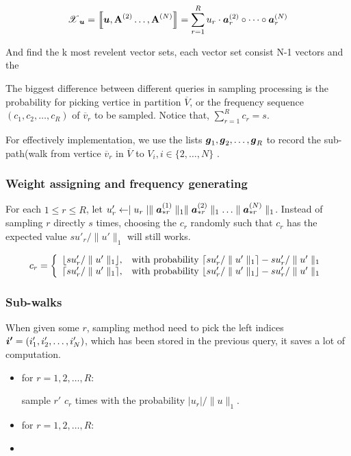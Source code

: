 \documentclass{article}
\newcommand{\T}[1]{\boldsymbol{\mathscr{\MakeUppercase{#1}}}}%
\newcommand{\V}[1]{{\bm{{\MakeLowercase{#1}}}}}%
\newcommand{\VnC}[3]{\V{#1}^{(#2)}_{#3}}%
\newcommand{\Vacol}[1]{\V{a}^{(#1)}_{*r}}
\newcommand{\M}[1]{{\bm{\mathbf{\MakeUppercase{#1}}}}}%
\newcommand{\Mn}[2]{\M{#1}^{(#2)}}%
\newcommand{\norm}[2]{\parallel#1\parallel_{#2}}
\newcommand{\KT}[1]{\left\llbracket #1 \right\rrbracket}
\begin{document}
\begin{equation}\label{eq:RankTensorCP}
\T{X}_{\V{u}}= \KT{ \V{u},\Mn{A}{2}\dots,\Mn{A}{N}} =
\sum_{r=1}^{R} u_r \cdot \VnC{A}{2}{r}\circ \cdots \circ \VnC{A}{N}{r}
\end{equation}

And find the k most revelent vector sets, each vector set consist N-1 vectors and the

The biggest difference between different queries in sampling processing is the probability for picking vertice in partition $\overline{V}$, or the frequency sequence $(c_1,c_2,\ldots,c_R)$ of $\overline{v}_r$ to be sampled. Notice that, $\sum_{r=1}^{R}c_r = s$.

For effectively implementation, we use the lists $\V{g}_1,\V{g}_2,\ldots,\V{g}_R$ to record the sub-path(walk from vertice $\overline{v}_r$ in $\overline{V}$ to $V_i,i\in\{2,\ldots,N\}$ .


\subsubsection{Weight assigning and frequency generating}
For each $1 \leq r \leq R$, let $u'_r \leftarrow \mid u_r\mid \norm{\Vacol{1}}{1} \norm{\Vacol{2}}{1} \ldots \norm{\Vacol{N}}{1}$. 
Instead of sampling $r$ directly $s$ times, choosing the $c_r$ randomly such that $c_r$ has the expected value $su'_r/\norm{u'}{1}$ will still works.

 \begin{equation*}c_r=
    \left\{
      \begin{array}{ll}
        \lfloor su'_r/\norm{u'}{1} \rfloor,
        & \hbox{with probability $\lceil su'_r/\norm{u'}{1} \rceil - su'_r/\norm{u'}{1}$} \\
        \lceil su'_r/\norm{u'}{1} \rceil,
        & \hbox{with probability $\lfloor su'_r/\norm{u'}{1} \rfloor - su'_r/\norm{u'}{1}$}
      \end{array}
    \right.
    \end{equation*}
    
\subsubsection{Sub-walks}
When given some $r$, sampling method need to pick the left indices $\V{i'} = (i'_1,i'_2,\ldots,i'_N)$, which has been stored in the previous query, it saves a lot of computation.
\begin{itemize}
  \item for $r = 1,2,\ldots,R$:
  
        sample $r'$ $c_r$ times with the probability $|u_r|/\norm{u}{1}$.
        
  \item for $r = 1,2,\ldots,R$:
  
  \item 
\end{itemize}
\end{document}
